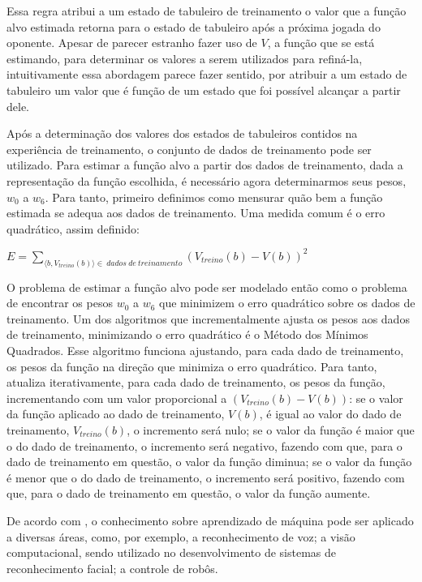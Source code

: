 Essa regra atribui a um estado de tabuleiro de treinamento o valor que a função alvo estimada retorna para o estado de tabuleiro após a próxima jogada do oponente. Apesar de parecer estranho fazer uso de $V$, a função que se está estimando, para determinar os valores a serem utilizados para refiná-la, intuitivamente essa abordagem parece fazer sentido, por atribuir a um estado de tabuleiro um valor que é função de um estado que foi possível alcançar a partir dele. 

Após a determinação dos valores dos estados de tabuleiros contidos na experiência de treinamento, o conjunto de dados de treinamento pode ser utilizado. Para estimar a função alvo a partir dos dados de treinamento, dada a representação da função escolhida, é necessário agora determinarmos seus pesos, $w_0$ a $w_6$. Para tanto, primeiro definimos como mensurar quão bem a função estimada se adequa aos dados de treinamento. Uma medida comum é o erro quadrático, assim definido:

$E = \sum\limits_{\langle b, V_{treino}(b) \rangle \in \ dados\ de\ treinamento} {(V_{treino}(b) - V(b))}^2$

O problema de estimar a função alvo pode ser modelado então como o problema de encontrar os pesos $w_0$ a $w_6$ que minimizem o erro quadrático sobre os dados de treinamento. Um dos algoritmos que incrementalmente ajusta os pesos aos dados de treinamento, minimizando o erro quadrático é o Método dos Mínimos Quadrados. Esse algoritmo funciona ajustando, para cada dado de treinamento, os pesos da função na direção que minimiza o erro quadrático. Para tanto, atualiza iterativamente, para cada dado de treinamento, os pesos da função, incrementando com um valor proporcional a $(V_{treino}(b) - V(b))$: se o valor da função aplicado ao dado de treinamento, $V(b)$, é igual ao valor do dado de treinamento, $V_{treino}(b)$, o incremento será nulo; se o valor da função é maior que o do dado de treinamento, o incremento será negativo, fazendo com que, para o dado de treinamento em questão, o valor da função diminua; se o valor da função é menor que o do dado de treinamento, o incremento será positivo, fazendo com que, para o dado de treinamento em questão, o valor da função aumente.



De acordo com \cite{Mitchell_discipline}, o conhecimento sobre aprendizado de máquina pode ser aplicado a diversas áreas, como, por exemplo, a reconhecimento de voz; a visão computacional, sendo utilizado no desenvolvimento de sistemas de reconhecimento facial; a controle de robôs.